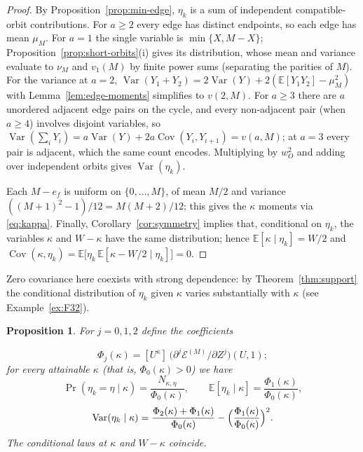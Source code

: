 \documentclass[preprint,12pt,a4paper]{elsarticle}
\newcommand{\Epoly}{\mathscr E}
\newtheorem{proposition}[theorem]{Proposition}
\theoremstyle{definition}
\theoremstyle{remark}
\begin{document}
\begin{proof}
By Proposition~\ref{prop:min-edge}, $\eta_k$ is a sum of independent
compatible-orbit contributions.  For $a\geq2$ every edge has distinct
endpoints, so each edge has mean $\mu_M$.  For $a=1$ the single variable is
$\min\{X,M-X\}$; Proposition~\ref{prop:short-orbits}(i) gives its distribution,
whose mean and variance evaluate to $\nu_M$ and $v_1(M)$ by finite power sums
(separating the parities of $M$).  For the variance at $a=2$,
$\operatorname{Var}(Y_1+Y_2)=2\operatorname{Var}(Y)
 +2(\mathbb{E}[Y_1Y_2]-\mu_M^2)$ with
Lemma~\ref{lem:edge-moments} simplifies to $v(2,M)$.  For $a\geq3$ there are
$a$ unordered adjacent edge pairs on the cycle, and every non-adjacent pair
(when $a\geq4$) involves disjoint variables, so
$\operatorname{Var}(\sum_iY_i)=a\operatorname{Var}(Y)
 +2a\operatorname{Cov}(Y_i,Y_{i+1})=v(a,M)$; at $a=3$ every pair is adjacent,
which the same count encodes.  Multiplying by $w_O^2$ and adding over
independent orbits gives $\operatorname{Var}(\eta_k)$.

Each $M-e_f$ is uniform on $\{0,\ldots,M\}$, of mean $M/2$ and variance
$((M+1)^2-1)/12=M(M+2)/12$; this gives the $\kappa$ moments via
\eqref{eq:kappa}.  Finally, Corollary~\ref{cor:symmetry} implies that,
conditional on $\eta_k$, the variables $\kappa$ and $W-\kappa$ have the same
distribution; hence $\mathbb{E}[\kappa\mid\eta_k]=W/2$ and
$\operatorname{Cov}(\kappa,\eta_k)
 =\mathbb{E}\bigl[\eta_k\,\mathbb{E}[\kappa-W/2\mid\eta_k]\bigr]=0$.
\end{proof}

Zero covariance here coexists with strong dependence: by
Theorem~\ref{thm:support} the conditional distribution of $\eta_k$ given
$\kappa$ varies substantially with $\kappa$ (see Example~\ref{ex:F32}).

\begin{proposition}\label{prop:conditional}
For $j=0,1,2$ define the coefficients

\[
\Phi_j(\kappa)=[U^\kappa]\,\bigl(\partial^j\Epoly^{(M)}/\partial Z^j\bigr)(U,1);
\]
for every attainable $\kappa$ (that is, $\Phi_0(\kappa)>0$) we have
\[
\Pr(\eta_k=\eta\mid\kappa)=\frac{N_{\kappa,\eta}}{\Phi_0(\kappa)},\qquad
\mathbb{E}[\eta_k\mid\kappa]=\frac{\Phi_1(\kappa)}{\Phi_0(\kappa)},
\]
\[
\operatorname{Var}(\eta_k\mid\kappa)
 =\frac{\Phi_2(\kappa)+\Phi_1(\kappa)}{\Phi_0(\kappa)}
  -\Bigl(\frac{\Phi_1(\kappa)}{\Phi_0(\kappa)}\Bigr)^2.
\]
The conditional laws at $\kappa$ and $W-\kappa$ coincide.
\end{proposition}
\end{document}
